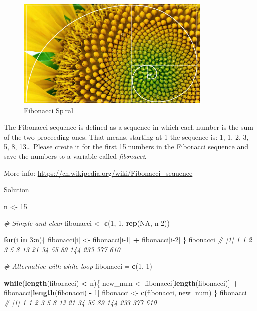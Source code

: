 \documentclass[
]{book}
\newenvironment{Shaded}{\begin{snugshade}}{\end{snugshade}}
\newcommand{\CommentTok}[1]{\textcolor[rgb]{0.56,0.35,0.01}{\textit{#1}}}
\newcommand{\ConstantTok}[1]{\textcolor[rgb]{0.56,0.35,0.01}{#1}}
\newcommand{\ControlFlowTok}[1]{\textcolor[rgb]{0.13,0.29,0.53}{\textbf{#1}}}
\newcommand{\DecValTok}[1]{\textcolor[rgb]{0.00,0.00,0.81}{#1}}
\newcommand{\FunctionTok}[1]{\textcolor[rgb]{0.13,0.29,0.53}{\textbf{#1}}}
\newcommand{\NormalTok}[1]{#1}
\newcommand{\OtherTok}[1]{\textcolor[rgb]{0.56,0.35,0.01}{#1}}
\newcommand{\SpecialCharTok}[1]{\textcolor[rgb]{0.81,0.36,0.00}{\textbf{#1}}}
\begin{document}
\begin{figure}
\centering
\includegraphics[width=\textwidth,height=2.08333in]{./img/fibonacci.jpg}
\caption{Fibonacci Spiral}
\end{figure}

The Fibonacci sequence is defined as a sequence in which each number is the sum of the two proceeding ones.
That means, starting at 1 the sequence is: 1, 1, 2, 3, 5, 8, 13\ldots{}
Please create it for the first 15 numbers in the Fibonacci sequence and save the numbers to a variable called \emph{fibonacci}.

More info: \url{https://en.wikipedia.org/wiki/Fibonacci_sequence}.

Solution

\begin{Shaded}
\begin{Highlighting}[]
\NormalTok{n }\OtherTok{\textless{}{-}} \DecValTok{15}

\CommentTok{\# Simple and clear}
\NormalTok{fibonacci }\OtherTok{\textless{}{-}} \FunctionTok{c}\NormalTok{(}\DecValTok{1}\NormalTok{, }\DecValTok{1}\NormalTok{, }\FunctionTok{rep}\NormalTok{(}\ConstantTok{NA}\NormalTok{, n}\DecValTok{{-}2}\NormalTok{))}

\ControlFlowTok{for}\NormalTok{(i }\ControlFlowTok{in} \DecValTok{3}\SpecialCharTok{:}\NormalTok{n)\{}
\NormalTok{  fibonacci[i] }\OtherTok{\textless{}{-}}\NormalTok{ fibonacci[i}\DecValTok{{-}1}\NormalTok{] }\SpecialCharTok{+}\NormalTok{ fibonacci[i}\DecValTok{{-}2}\NormalTok{]}
\NormalTok{\}}
\NormalTok{fibonacci}
\CommentTok{\#  [1]   1   1   2   3   5   8  13  21  34  55  89 144 233 377 610}

\CommentTok{\# Alternative with while loop}
\NormalTok{fibonacci }\OtherTok{=} \FunctionTok{c}\NormalTok{(}\DecValTok{1}\NormalTok{, }\DecValTok{1}\NormalTok{)}

\ControlFlowTok{while}\NormalTok{(}\FunctionTok{length}\NormalTok{(fibonacci) }\SpecialCharTok{\textless{}}\NormalTok{ n)\{}
\NormalTok{  new\_num }\OtherTok{\textless{}{-}}\NormalTok{ fibonacci[}\FunctionTok{length}\NormalTok{(fibonacci)] }\SpecialCharTok{+}\NormalTok{ fibonacci[}\FunctionTok{length}\NormalTok{(fibonacci) }\SpecialCharTok{{-}} \DecValTok{1}\NormalTok{]}
\NormalTok{  fibonacci }\OtherTok{\textless{}{-}} \FunctionTok{c}\NormalTok{(fibonacci, new\_num)}
\NormalTok{\}}
\NormalTok{fibonacci}
\CommentTok{\#  [1]   1   1   2   3   5   8  13  21  34  55  89 144 233 377 610}
\end{Highlighting}
\end{Shaded}
\end{document}
